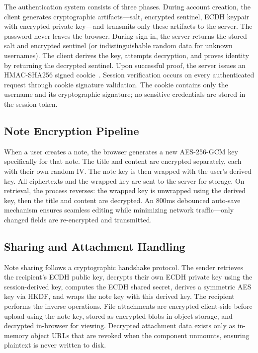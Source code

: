 \documentclass[conference]{IEEEtran}
\begin{document}
The authentication system consists of three phases. During account creation, the client generates cryptographic artifacts---salt, encrypted sentinel, ECDH keypair with encrypted private key---and transmits only these artifacts to the server. The password never leaves the browser. During sign-in, the server returns the stored salt and encrypted sentinel (or indistinguishable random data for unknown usernames). The client derives the key, attempts decryption, and proves identity by returning the decrypted sentinel. Upon successful proof, the server issues an HMAC-SHA256 signed cookie~\cite{ref10}. Session verification occurs on every authenticated request through cookie signature validation. The cookie contains only the username and its cryptographic signature; no sensitive credentials are stored in the session token.

\subsection{Note Encryption Pipeline}

When a user creates a note, the browser generates a new AES-256-GCM key specifically for that note. The title and content are encrypted separately, each with their own random IV. The note key is then wrapped with the user's derived key. All ciphertexts and the wrapped key are sent to the server for storage. On retrieval, the process reverses: the wrapped key is unwrapped using the derived key, then the title and content are decrypted. An 800ms debounced auto-save mechanism ensures seamless editing while minimizing network traffic---only changed fields are re-encrypted and transmitted.

\subsection{Sharing and Attachment Handling}

Note sharing follows a cryptographic handshake protocol. The sender retrieves the recipient's ECDH public key, decrypts their own ECDH private key using the session-derived key, computes the ECDH shared secret, derives a symmetric AES key via HKDF, and wraps the note key with this derived key. The recipient performs the inverse operations. File attachments are encrypted client-side before upload using the note key, stored as encrypted blobs in object storage, and decrypted in-browser for viewing. Decrypted attachment data exists only as in-memory object URLs that are revoked when the component unmounts, ensuring plaintext is never written to disk.
\end{document}

